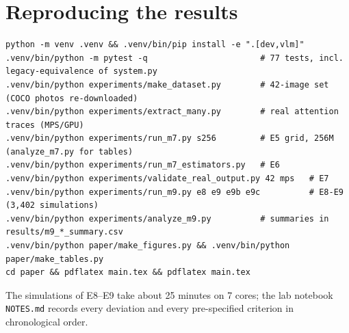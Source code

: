 \documentclass[10pt,a4paper]{article}
\begin{document}
\section{Reproducing the results}
\begin{verbatim}
python -m venv .venv && .venv/bin/pip install -e ".[dev,vlm]"
.venv/bin/python -m pytest -q                       # 77 tests, incl. legacy-equivalence of system.py
.venv/bin/python experiments/make_dataset.py        # 42-image set (COCO photos re-downloaded)
.venv/bin/python experiments/extract_many.py        # real attention traces (MPS/GPU)
.venv/bin/python experiments/run_m7.py s256         # E5 grid, 256M      (analyze_m7.py for tables)
.venv/bin/python experiments/run_m7_estimators.py   # E6
.venv/bin/python experiments/validate_real_output.py 42 mps   # E7
.venv/bin/python experiments/run_m9.py e8 e9 e9b e9c          # E8-E9 (3,402 simulations)
.venv/bin/python experiments/analyze_m9.py          # summaries in results/m9_*_summary.csv
.venv/bin/python paper/make_figures.py && .venv/bin/python paper/make_tables.py
cd paper && pdflatex main.tex && pdflatex main.tex
\end{verbatim}
The simulations of E8--E9 take about 25 minutes on 7 cores; the lab notebook \texttt{NOTES.md} records every deviation and every pre-specified criterion in chronological order.
\end{document}
